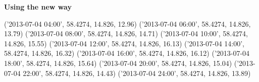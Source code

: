 \documentclass[a4paper,titlepage,12pt]{article}
\begin{document}
\textbf{Using the new way}

('2013-07-04 04:00', 58.4274, 14.826, 12.96)
('2013-07-04 06:00', 58.4274, 14.826, 13.79)
('2013-07-04 08:00', 58.4274, 14.826, 14.71)
('2013-07-04 10:00', 58.4274, 14.826, 15.55)
('2013-07-04 12:00', 58.4274, 14.826, 16.13)
('2013-07-04 14:00', 58.4274, 14.826, 16.32)
('2013-07-04 16:00', 58.4274, 14.826, 16.12)
('2013-07-04 18:00', 58.4274, 14.826, 15.64)
('2013-07-04 20:00', 58.4274, 14.826, 15.04)
('2013-07-04 22:00', 58.4274, 14.826, 14.43)
('2013-07-04 24:00', 58.4274, 14.826, 13.89)
\end{document}
